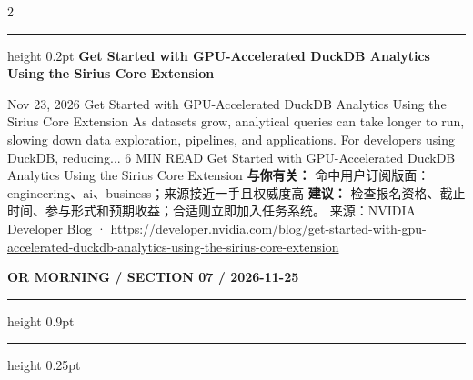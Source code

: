 \documentclass[10.5pt]{ctexart}
\begin{document}
\begin{multicols}{2}
\hrule height 0.2pt
\vspace{2mm}
{\large\bfseries Get Started with GPU-Accelerated DuckDB Analytics Using the Sirius Core Extension}\par
Nov 23, 2026 Get Started with GPU-Accelerated DuckDB Analytics Using the Sirius Core Extension As datasets grow, analytical queries can take longer to run, slowing down data exploration, pipelines, and applications. For developers using DuckDB, reducing... 6 MIN READ Get Started with GPU-Accelerated DuckDB Analytics Using the Sirius Core Extension
\textbf{与你有关：} 命中用户订阅版面：engineering、ai、business；来源接近一手且权威度高
\textbf{建议：} 检查报名资格、截止时间、参与形式和预期收益；合适则立即加入任务系统。
{\footnotesize\color{ormuted} 来源：NVIDIA Developer Blog · \url{https://developer.nvidia.com/blog/get-started-with-gpu-accelerated-duckdb-analytics-using-the-sirius-core-extension}}
\end{multicols}
\newpage
{\small\bfseries OR MORNING / SECTION 07 / 2026-11-25}
\vspace{2mm}
\hrule height 0.9pt
\vspace{1.5mm}
\hrule height 0.25pt
\vspace{4mm}
\end{document}
